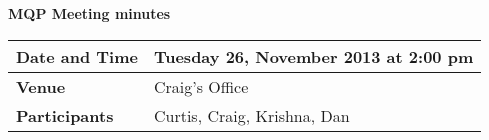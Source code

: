 \documentclass[a4wide,10pt]{extarticle}
\begin{document}
\thispagestyle{empty}

\begin{center}
\textbf{MQP Meeting minutes}
\vspace{0.33cm}
\end{center}

\begin{center}
\begin{tabular}{| m{2.8cm} | m{13.6cm} |} \hline
\textbf{Date and Time} & Tuesday 26, November 2013 at 2:00 pm \\ \hline
\textbf{Venue} & Craig's Office \\ \hline
\textbf{Participants} & Curtis, Craig, Krishna, Dan\\ \hline
\end{tabular}
\end{center}
\end{document}
